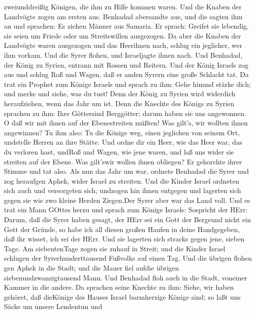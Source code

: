 zweiunddreißig Königen, die ihm zu Hilfe kommen waren.  Und
die Knaben der Landvögte zogen am ersten aus. Benhadad abersandte aus,
und die sagten ihm an und sprachen: Es ziehen Männer aus Samaria.
 Er sprach: Greifet sie lebendig, sie seien um Friede oder
um Streitswillen ausgezogen.  Da aber die Knaben der
Landvögte waren ausgezogen und das Heerihnen nach,  schlug
ein jeglicher, wer ihm vorkam. Und die Syrer flohen, und Israeljagte
ihnen nach. Und Benhadad, der König zu Syrien, entrann mit Rossen und
Reitern.  Und der König Israels zog aus und schlug Roß und
Wagen, daß er anden Syrern eine große Schlacht tat.  Da
trat ein Prophet zum Könige Israels und sprach zu ihm: Gehe hinund
stärke dich; und merke und siehe, was du tust! Denn der König zu Syrien
wird widerdich heraufziehen, wenn das Jahr um ist.  Denn
die Knechte des Königs zu Syrien sprachen zu ihm: Ihre Göttersind
Berggötter; darum haben sie uns angewonnen. O daß wir mit ihnen auf der
Ebenestreiten müßten! Was gilt's, wir wollten ihnen angewinnen?
 Tu ihm also: Tu die Könige weg, einen jeglichen von seinem
Ort, undstelle Herren an ihre Stätte.  Und ordne dir ein
Heer, wie das Heer war, das du verloren hast, undRoß und Wagen, wie jene
waren, und laß uns wider sie streiten auf der Ebene. Was gilt'swir
wollen ihnen obliegen? Er gehorchte ihrer Stimme und tat also.
 Als nun das Jahr um war, ordnete Benhadad die Syrer und
zog heraufgen Aphek, wider Israel zu streiten.  Und die
Kinder Israel ordneten sich auch und versorgeten sich; undzogen hin
ihnen entgegen und lagerten sich gegen sie wie zwo kleine Herden
Ziegen.Der Syrer aber war das Land voll.  Und es trat ein
Mann GOttes herzu und sprach zum Könige Israels: Sospricht der HErr:
Darum, daß die Syrer haben gesagt, der HErr sei ein Gott der Bergeund
nicht ein Gott der Gründe, so habe ich all diesen großen Haufen in deine
Handgegeben, daß ihr wisset, ich sei der HErr.  Und sie
lagerten sich stracks gegen jene, sieben Tage. Am siebentenTage zogen
sie zuhauf in Streit; und die Kinder Israel schlugen der
Syrerhunderttausend Fußvolks auf einen Tag.  Und die
übrigen flohen gen Aphek in die Stadt; und die Mauer fiel aufdie übrigen
siebenundzwanzigtausend Mann. Und Benhadad floh auch in die Stadt,
voneiner Kammer in die andere.  Da sprachen seine Knechte
zu ihm: Siehe, wir haben gehöret, daß dieKönige des Hauses Israel
barmherzige Könige sind; so laßt uns Säcke um unsere Lendentun und
